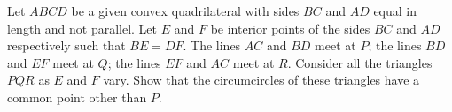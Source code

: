 Let $ABCD$ be a given convex quadrilateral with sides $BC$ and $AD$ equal in length and not parallel. Let $E$ and $F$ be interior points of the sides $BC$ and $AD$ respectively such that $BE = DF$. The lines $AC$ and $BD$ meet at $P$; the lines $BD$ and $EF$ meet at $Q$; the lines $EF$ and $AC$ meet at $R$. Consider all the triangles $PQR$ as $E$ and $F$ vary. Show that the circumcircles of these triangles have a common point other than $P$.
